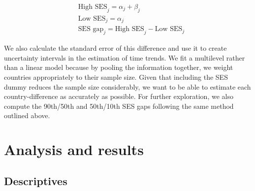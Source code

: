 \documentclass[11pt, a4paper]{article}\usepackage[]{graphicx}\usepackage[]{color}
\begin{document}
\begin{equation}
\begin{split}
\quad \text{High SES}_j = \alpha_j + \beta_j \\
\quad \text{Low SES}_j = \alpha_j \\
\quad \text{SES gap}_j = \text{High SES}_j - \text{Low SES}_j
\end{split}
\end{equation}

We also calculate the standard error of this difference and use it to create uncertainty intervals in the estimation of time trends. We fit a multilevel rather than a linear model because by pooling the information together, we weight countries appropriately to their sample size. Given that including the SES dummy reduces the sample size considerably, we want to be able to estimate each country-difference as accurately as possible. For further exploration, we also compute the 90th/50th and 50th/10th SES gaps following the same method outlined above.

\section{Analysis and results}

\subsection{Descriptives}





\end{document}
